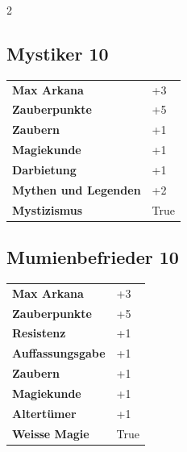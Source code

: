 \begin{multicols}{2}
\begin{tcolorbox}

\end{tcolorbox}

\begin{tcolorbox}
    \subsection*{Mystiker \hfill \small{10 }}
    \tcblower




\begin{tabular}{@{}ll@{}}
    \textbf{Max Arkana} & +3\\
    \textbf{Zauberpunkte} & +5\\
    \textbf{Zaubern} & +1\\
    \textbf{Magiekunde} & +1\\
    \textbf{Darbietung} & +1\\
    \textbf{Mythen und Legenden} & +2\\
    \textbf{Mystizismus} & True\\
\end{tabular}


\end{tcolorbox}

\begin{tcolorbox}
    \subsection*{Mumienbefrieder \hfill \small{10 }}
    \tcblower




\begin{tabular}{@{}ll@{}}
    \textbf{Max Arkana} & +3\\
    \textbf{Zauberpunkte} & +5\\
    \textbf{Resistenz} & +1\\
    \textbf{Auffassungsgabe} & +1\\
    \textbf{Zaubern} & +1\\
    \textbf{Magiekunde} & +1\\
    \textbf{Altertümer} & +1\\
    \textbf{Weisse Magie} & True\\
\end{tabular}


\end{tcolorbox}
\end{multicols}
